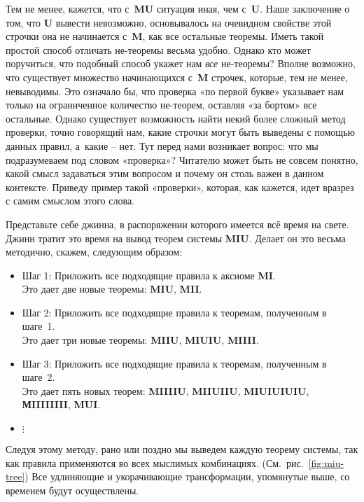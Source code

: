 \documentclass[../main.tex]{subfiles}
\begin{document}
Тем не менее, кажется, что с~\textbf{MU} ситуация иная, чем с~\textbf{U}\@. Наше заключение о том, что \textbf{U} вывести невозможно, основывалось на очевидном свойстве этой строчки она не начинается с~\textbf{M}, как все остальные теоремы. Иметь такой простой способ отличать не-теоремы весьма удобно. Однако кто может поручиться, что подобный способ укажет нам \emph{все} не-теоремы? Вполне возможно, что существует множество начинающихся с~\textbf{M} строчек, которые, тем не менее, невыводимы. Это означало бы, что проверка «по первой букве» указывает нам только на ограниченное количество не-теорем, оставляя «за бортом» все остальные. Однако существует возможность найти некий более сложный метод проверки, точно говорящий нам, какие строчки могут быть выведены с помощью данных правил, а~какие \--- нет. Тут перед нами возникает вопрос: что мы подразумеваем под словом «проверка»? Читателю может быть не совсем понятно, какой смысл задаваться этим вопросом и почему он столь важен в данном контексте. Приведу пример такой «проверки», которая, как кажется, идет вразрез с самим смыслом этого слова.

Представьте себе джинна, в распоряжении которого имеется всё время на свете. Джинн тратит это время на вывод теорем системы \textbf{MIU}\@. Делает он это весьма методично, скажем, следующим образом:

\begin{itemize}[
    noitemsep,
    topsep=4pt,
    label={},
    leftmargin=\parindent,
]
    \item Шаг 1: Приложить все подходящие правила к аксиоме \textbf{MI}\@. \\
    Это дает две новые теоремы: \textbf{MIU}, \textbf{MII}.

    \item Шаг 2: Приложить все подходящие правила к теоремам, полученным в шаге~1. \\
    Это дает три новые теоремы: \textbf{MIIU}, \textbf{MIUIU}, \textbf{MIIII}.

    \item Шаг 3: Приложить все подходящие правила к теоремам, полученным в шаге~2. \\
    Это дает пять новых теорем: \textbf{MIIIIU}, \textbf{MIIUIIU}, \textbf{MIUIUIUIU}, \textbf{МIIIIIIII}, \textbf{MUI}.

    \item \quad$\bm{{\vdots}}$
\end{itemize}

Следуя этому методу, рано или поздно мы выведем каждую теорему системы, так как правила применяются во всех мыслимых комбинациях. (См.~рис.~\ref{fig:miu-tree})
Все удлиняющие и укорачивающие трансформации, упомянутые выше, со временем будут осуществлены.
\end{document}
